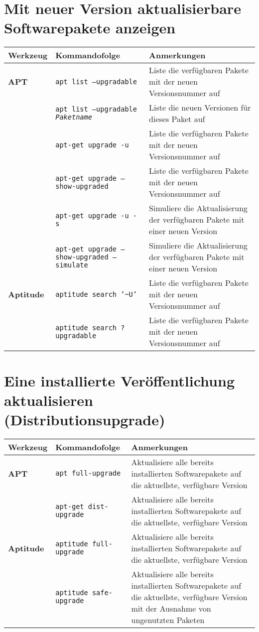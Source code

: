 \documentclass[10pt,a4paper]{article}
\begin{document}
\newpage

\cheatsheet

\section{Mit neuer Version aktualisierbare Softwarepakete anzeigen}
\begin{tabular}{ p{3.5cm} p{9.6cm} p{11cm}}
  \hline
  \rowcolor{Gray}
  \textbf{Werkzeug} & \textbf{Kommandofolge} & \textbf{Anmerkungen} \\
  \hline 
  \textbf{APT} & \texttt{apt list --upgradable} & Liste die verfügbaren Pakete mit der neuen Versionsnummer auf\\
  \rowcolor{Gray}
  & \texttt{apt list --upgradable \textit{Paketname}} & Liste die neuen Versionen für dieses Paket auf\\
  & \texttt{apt-get upgrade -u} & Liste die verfügbaren Pakete mit der neuen Versionsnummer auf \\
  \rowcolor{Gray}
  & \texttt{apt-get upgrade --show-upgraded} & Liste die verfügbaren Pakete mit der neuen Versionsnummer auf \\
  & \texttt{apt-get upgrade -u -s} & Simuliere die Aktualisierung der verfügbaren Pakete mit einer neuen Version \\
  \rowcolor{Gray}
  & \texttt{apt-get upgrade --show-upgraded --simulate} & Simuliere die Aktualisierung der verfügbaren Pakete mit einer neuen Version \\
  \textbf{Aptitude} & \texttt{aptitude search '\textasciitilde{U}'} & Liste die verfügbaren Pakete mit der neuen Versionsnummer auf \\
  \rowcolor{Gray}
  & \texttt{aptitude search ?upgradable} &  Liste die verfügbaren Pakete mit der neuen Versionsnummer auf \\
  \hline
\end{tabular}

\section{Eine installierte Veröffentlichung aktualisieren (Distributionsupgrade)}
\begin{tabular}{ p{3.5cm} p{9.6cm} p{11cm}}
  \hline
  \rowcolor{Gray}
  \textbf{Werkzeug} & \textbf{Kommandofolge} & \textbf{Anmerkungen} \\
  \hline 
  \textbf{APT} & \texttt{apt full-upgrade} & Aktualisiere alle bereits installierten Softwarepakete auf die aktuellste, verfügbare Version \\
  \rowcolor{Gray}
  & \texttt{apt-get dist-upgrade} & Aktualisiere alle bereits installierten Softwarepakete auf die aktuellste, verfügbare Version \\
  \textbf{Aptitude} & \texttt{aptitude full-upgrade} & Aktualisiere alle bereits installierten Softwarepakete auf die aktuellste, verfügbare Version \\
  \rowcolor{Gray}
  & \texttt{aptitude safe-upgrade} &  Aktualisiere alle bereits installierten Softwarepakete auf die aktuellste, verfügbare Version mit der Ausnahme von ungenutzten Paketen \\
  \hline
\end{tabular}
\end{document}

